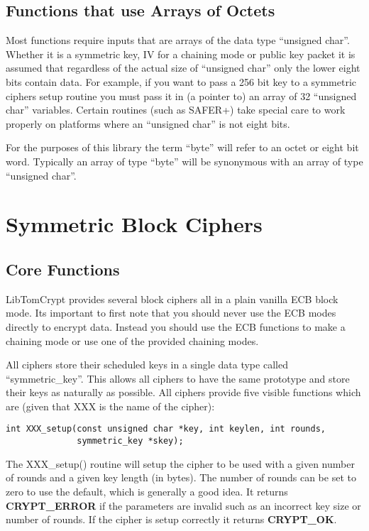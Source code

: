 \documentclass{book}
\begin{document}
\section{Functions that use Arrays of Octets}
Most functions require inputs that are arrays of the data type ``unsigned char''.  Whether it is a symmetric key, IV
for a chaining mode or public key packet it is assumed that regardless of the actual size of ``unsigned char'' only the
lower eight bits contain data.  For example, if you want to pass a 256 bit key to a symmetric ciphers setup routine
you must pass it in (a pointer to) an array of 32 ``unsigned char'' variables.  Certain routines 
(such as SAFER+) take special care to work properly on platforms where an ``unsigned char'' is not eight bits.

For the purposes of this library the term ``byte'' will refer to an octet or eight bit word.  Typically an array of
type ``byte'' will be synonymous with an array of type ``unsigned char''.

\chapter{Symmetric Block Ciphers}
\section{Core Functions}

LibTomCrypt provides several block ciphers all in a plain vanilla ECB block mode.  Its important to first note that you 
should never use the ECB modes directly to encrypt data.  Instead you should use the ECB functions to make a chaining mode
or use one of the provided chaining modes.  

All ciphers store their scheduled keys in a single data type called ``symmetric\_key''.  This allows all ciphers to 
have the same prototype and store their keys as  naturally as possible.  All ciphers provide five visible functions which
are (given that XXX is the name of the cipher):
\begin{verbatim}
int XXX_setup(const unsigned char *key, int keylen, int rounds, 
              symmetric_key *skey);
\end{verbatim}

The XXX\_setup() routine will setup the cipher to be used with a given number of rounds and a given key length (in bytes).
The number of rounds can be set to zero to use the default, which is generally a good idea.  It returns 
{\bf CRYPT\_ERROR} if the parameters are invalid such as an incorrect key size or number of rounds.  If the cipher is 
setup correctly it returns {\bf CRYPT\_OK}.
\end{document}
